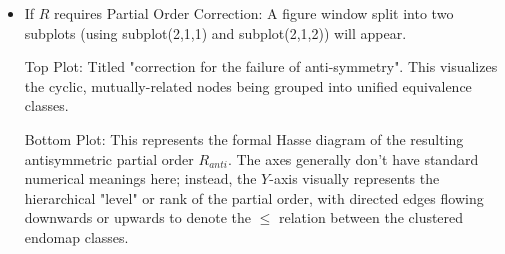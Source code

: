      \begin{itemize}
             \item If $R$ requires Partial Order Correction: A figure window split into two subplots (using subplot(2,1,1) and subplot(2,1,2)) will appear.
             
             \begin{itemize}
                 Top Plot: Titled "correction for the failure of anti-symmetry". This visualizes the cyclic, mutually-related nodes being grouped into unified equivalence classes.
             \end{itemize}
             
             \begin{itemize}
                 Bottom Plot: This represents the formal Hasse diagram of the resulting antisymmetric partial order $R_{anti}$. The axes generally don't have standard numerical meanings here; instead, the $Y$-axis visually represents the hierarchical "level" or rank of the partial order, with directed edges flowing downwards or upwards to denote the $\leq$ relation between the clustered endomap classes.
             \end{itemize}
    \end{itemize}

